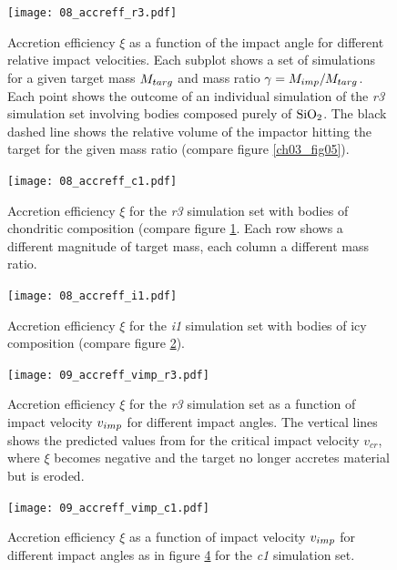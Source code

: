\begin{landscape}
\begin{figure}[htbp]
\begin{center}
\texttt{[image: 08\_accreff\_r3.pdf]}
\caption{Accretion efficiency $\xi$ as a function of the impact angle for different relative impact velocities. Each subplot shows a set of simulations for a given target mass $M_{targ}$ and mass ratio $\gamma = M_{imp} / M_{targ}$. Each point shows the outcome of an individual simulation of the \emph{r3} simulation set involving bodies composed purely of $\mathrm{SiO}_2$. The black dashed line shows the relative volume of the impactor hitting the target for the given mass ratio (compare figure \ref{ch03_fig05}).}
\label{ch03_fig08a}
\end{center}
\end{figure}

\begin{figure}[htbp]
\begin{center}
\texttt{[image: 08\_accreff\_c1.pdf]}
\caption{Accretion efficiency $\xi$ for the \emph{r3} simulation set with bodies of chondritic composition (compare figure \ref{ch03_fig08a}. Each row shows a different magnitude of target mass, each column a different mass ratio.}
\label{ch03_fig08b}
\end{center}
\end{figure}

\begin{figure}[htbp]
\begin{center}
\texttt{[image: 08\_accreff\_i1.pdf]}
\caption{Accretion efficiency $\xi$ for the \emph{i1} simulation set with bodies of icy composition (compare figure \ref{ch03_fig08b}).}
\label{ch03_fig08c}
\end{center}
\end{figure}

\begin{figure}[htbp]
\begin{center}
\texttt{[image: 09\_accreff\_vimp\_r3.pdf]}
\caption{Accretion efficiency $\xi$ for the \emph{r3} simulation set as a function of impact velocity $v_{imp}$ for different impact angles. The vertical lines shows the predicted values from \cite{2010ApJ...714L..21K} for the critical impact velocity $v_{cr}$, where $\xi$ becomes negative and the target no longer accretes material but is eroded.}
\label{ch03_fig09a}
\end{center}
\end{figure}

\begin{figure}[htbp]
\begin{center}
\texttt{[image: 09\_accreff\_vimp\_c1.pdf]}
\caption{Accretion efficiency $\xi$ as a function of impact velocity $v_{imp}$ for different impact angles as in figure \ref{ch03_fig09a} for the \emph{c1} simulation set.}
\label{ch03_fig09b}
\end{center}
\end{figure}


\end{landscape}
